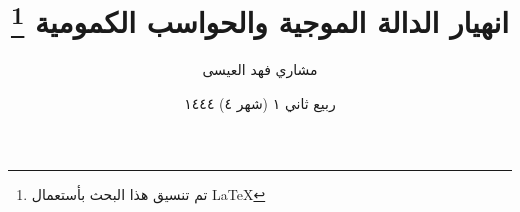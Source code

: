 
\author{
	\hsp
	مشاري فهد العيسى
}
\title{
	\hsp
	انهيار الدالة الموجية والحواسب الكمومية
	\footnote{
		\raggedleft
		تم تنسيق هذا البحث بأستعمال \LaTeX
	}
}

\date{
	\hsp
	ربيع ثاني ١ (شهر ٤) ١٤٤٤
}

\maketitle
	
	
